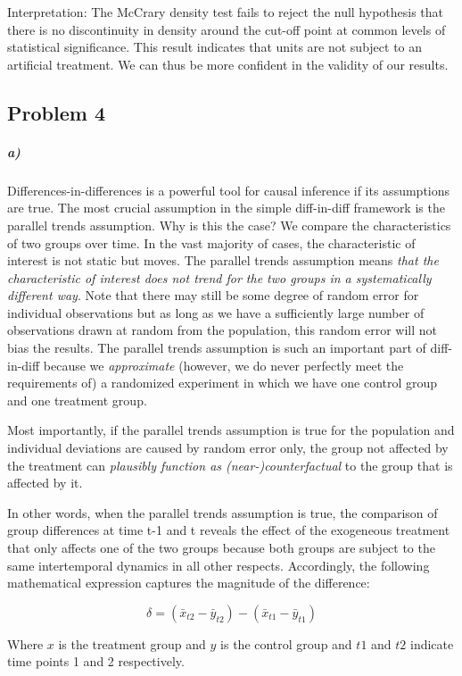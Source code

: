 \documentclass[12pt]{article}\usepackage[]{graphicx}\usepackage[]{color}
\begin{document}
Interpretation: The McCrary density test fails to reject the null hypothesis that there is no discontinuity in density around the cut-off point at common levels of statistical significance. This result indicates that units are not subject to an artificial treatment. We can thus be more confident in the validity of our results.



\subsection*{Problem 4}

\subparagraph{a)} Differences-in-differences is a powerful tool for causal inference if its assumptions are true. The most crucial assumption in the simple diff-in-diff framework is the parallel trends assumption. Why is this the case? We compare the characteristics of two groups over time. In the vast majority of cases, the characteristic of interest is not static but moves. The parallel trends assumption means \textit{that the characteristic of interest does not trend for the two groups in a systematically different way}. Note that there may still be some degree of random error for individual observations but as long as we have a sufficiently large number of observations drawn at random from the population, this random error will not bias the results. The parallel trends assumption is such an important part of diff-in-diff because we \textit{approximate} (however, we do never perfectly meet the requirements of) a randomized experiment in which we have one control group and one treatment group.

Most importantly, if the parallel trends assumption is true for the population and individual deviations are caused by random error only, the group not affected by the treatment can \textit{plausibly function as (near-)counterfactual} to the group that is affected by it.

In other words, when the parallel trends assumption is true, the comparison of group differences at time t-1 and t reveals the effect of the exogeneous treatment that only affects one of the two groups because both groups are subject to the same intertemporal dynamics in all other respects. Accordingly, the following mathematical expression captures the magnitude of the difference:

$$ \delta = (\bar{x} _{t2} - \bar{y} _{t2}) - (\bar{x} _{t1} - \bar{y} _{t1}) $$

Where $x$ is the treatment group and $y$ is the control group and $t1$ and $t2$ indicate time points 1 and 2 respectively.
\end{document}
